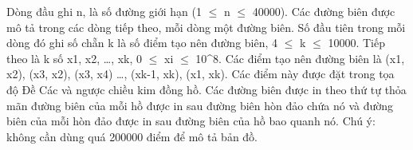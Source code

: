 Dòng đầu ghi n, là số đường giới hạn (1  $\le$  n  $\le$  40000).  Các đường biên được mô tả trong các dòng tiếp theo, mỗi dòng một đường biên. Số đầu tiên trong mỗi dòng đó ghi số chẵn k là số điểm tạo nên đường biên, 4  $\le$  k  $\le$  10000. Tiếp theo là k số x1, x2, …, xk, 0  $\le$  xi  $\le$  10^8. Các điểm tạo nên đường biên là (x1, x2), (x3, x2), (x3, x4) …, (xk-1, xk), (x1, xk). Các điểm này được đặt trong tọa độ Đề Các và ngược chiều kim đồng hồ. Các đường biên được in theo thứ tự thỏa mãn đường biên của mỗi hồ được in sau đường biên hòn đảo chứa nó và đường biên của mỗi hòn đảo được in sau đường biên của hồ bao quanh nó. Chú ý: không cần dùng quá 200000 điểm để mô tả bản đồ.
